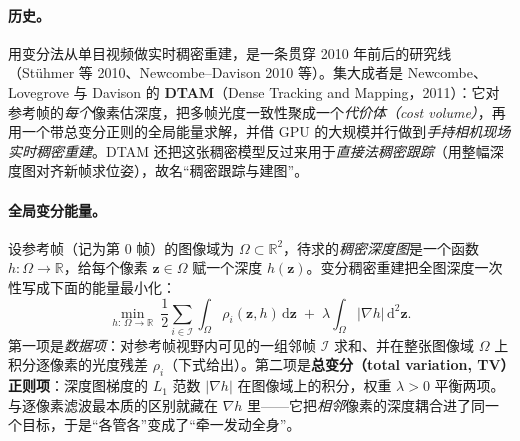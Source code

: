 \paragraph{历史。}
用变分法从单目视频做实时稠密重建，是一条贯穿 2010 年前后的研究线（Stühmer 等 2010、Newcombe--Davison 2010 等）\cite{carlone2026handbook}。集大成者是 Newcombe、Lovegrove 与 Davison 的 \textbf{DTAM}（Dense Tracking and Mapping，2011）\cite{newcombe2011dtam}：它对参考帧的\emph{每个}像素估深度，把多帧光度一致性聚成一个\emph{代价体（cost volume）}，再用一个带总变分正则的全局能量求解，并借 GPU 的大规模并行做到\emph{手持相机现场实时稠密重建}。DTAM 还把这张稠密模型反过来用于\emph{直接法稠密跟踪}（用整幅深度图对齐新帧求位姿），故名“稠密跟踪与建图”。

\paragraph{全局变分能量。}
设参考帧（记为第 $0$ 帧）的图像域为 $\Omega\subset\mathbb{R}^2$，待求的\emph{稠密深度图}是一个函数 $h:\Omega\to\mathbb{R}$，给每个像素 $\mathbf{z}\in\Omega$ 赋一个深度 $h(\mathbf{z})$。变分稠密重建把全图深度一次性写成下面的能量最小化\cite{carlone2026handbook}：
\begin{equation}
  \min_{h:\,\Omega\to\mathbb{R}}\ \frac12\sum_{i\in\mathcal{I}}\int_{\Omega}\rho_i(\mathbf{z},h)\,\mathrm{d}\mathbf{z}
  \;+\;\lambda\int_{\Omega}\bigl|\nabla h\bigr|\,\mathrm{d}^2\mathbf{z}.
  \label{eq:dense-dtam-energy}
\end{equation}
第一项是\emph{数据项}：对参考帧视野内可见的一组邻帧 $\mathcal{I}$ 求和、并在整张图像域 $\Omega$ 上积分逐像素的光度残差 $\rho_i$（下式给出）。第二项是\textbf{总变分（total variation, TV）正则项}：深度图梯度的 $L_1$ 范数 $|\nabla h|$ 在图像域上的积分，权重 $\lambda>0$ 平衡两项。与逐像素滤波最本质的区别就藏在 $\nabla h$ 里——它把\emph{相邻}像素的深度耦合进了同一个目标，于是“各管各”变成了“牵一发动全身”。

